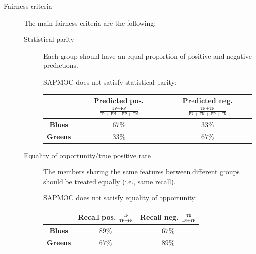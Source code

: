 \begin{description}
    \item[Fairness criteria]
        The main fairness criteria are the following:
        \begin{description}
            \item[Statistical parity] 
                Each group should have an equal proportion of positive and negative predictions.
                \begin{example}[SAPMOC]
                    SAPMOC does not satisfy statistical parity:
                    \begin{center}
                        \footnotesize
                        \begin{tabular}{c|cc}
                            \toprule
                                & \textbf{Predicted pos.} $\frac{\texttt{TP}+\texttt{FP}}{\texttt{TP}+\texttt{FN}+\texttt{FP}+\texttt{TN}}$ 
                                & \textbf{Predicted neg.} $\frac{\texttt{TN}+\texttt{TN}}{\texttt{FN}+\texttt{FN}+\texttt{FP}+\texttt{TN}}$ \\
                            \midrule
                                \textbf{Blues} & $67\%$ & $33\%$ \\
                                \textbf{Greens} & $33\%$ & $67\%$ \\
                            \bottomrule
                        \end{tabular}
                    \end{center}
                \end{example}

            \item[Equality of opportunity/true positive rate] 
                The members sharing the same features between different groups should be treated equally (i.e., same recall).
                \begin{example}[SAPMOC]
                    SAPMOC does not satisfy equality of opportunity:
                    \begin{center}
                        \footnotesize
                        \begin{tabular}{c|cc}
                            \toprule
                                & \textbf{Recall pos.} $\frac{\texttt{TP}}{\texttt{TP}+\texttt{FN}}$ 
                                & \textbf{Recall neg.} $\frac{\texttt{TN}}{\texttt{TN}+\texttt{FP}}$ \\
                            \midrule
                                \textbf{Blues} & $89\%$ & $67\%$ \\
                                \textbf{Greens} & $67\%$ & $89\%$ \\
                            \bottomrule
                        \end{tabular}
                    \end{center}
                \end{example}


\end{description}
\end{description}
